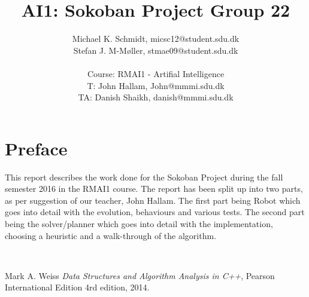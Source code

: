 \documentclass[10pt,a4paper,titlepage]{article}
\author{Michael K. Schmidt, micsc12@student.sdu.dk \\ Stefan J. M-Møller, stmae09@student.sdu.dk \\ \\ Course: RMAI1 - Artifial Intelligence \\  T: John Hallam, John@mmmi.sdu.dk \\ TA: Danish Shaikh, danish@mmmi.sdu.dk}
\title{AI1: Sokoban Project Group 22}
\begin{document}
\maketitle
\setcounter{secnumdepth}{2}
\section{Preface}
This report describes the work done for the Sokoban Project during the fall semester 2016 in the RMAI1 course. 
The report has been split up into two parts, as per suggestion of our teacher, John Hallam. The first part being Robot which goes into detail with the evolution, behaviours and various tests. The second part being the solver/planner which goes into detail with the implementation, choosing a heuristic and a walk-through of the algorithm. 

\setcounter{tocdepth}{2}
\tableofcontents




~\\[80pt]
\begin{thebibliography}{9}
  Mark A. Weiss
  \emph{Data Structures and Algorithm Analysis in C++},
  Pearson
  International Edition
  4rd edition,
  2014.
\end{thebibliography}
\end{document}

